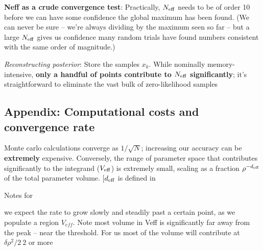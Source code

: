 \documentclass[twocolumn,prd,nofootinbib]{revtex4}
\begin{document}
\begin{shaded}
\noindent \textbf{Neff as  a crude convergence test}: Practically, $N_{\rm eff}$ needs to be of order 10 before we can have some confidence the global maximum has been
found.  (We can never be sure -- we're always dividing by the maximum seen so far -- but a large $N_{\rm eff}$ gives us
confidence many random trials have found numbers consistent with the same order of magnitude.)
\end{shaded}

\noindent \emph{Reconstructing posterior}: Store the samples $x_k$.  While nominally memory-intensive, \textbf{only a handful of
  points contribute to $N_{\rm eff}$ significantly}; it's straightforward to eliminate the vast bulk of zero-likelihood samples



\subsection{Appendix: Computational costs and convergence rate}
Monte carlo calculations converge as $1/\sqrt{N}$; increasing our accuracy can be \textbf{extremely} expensive.  
%
Conversely, the range of parameter space that contributes significantly to the integrand ($V_{\rm eff}$) is extremely
small, scaling as a fraction $\rho^{-d_{\rm eff}}$ of the total parameter volume.  [$d_{\rm eff}$ is defined in \cite{gwastro-mergers-HeeSuk-CompareToPE-Aligned}

\begin{shaded}
Notes for 

we expect the rate to grow slowly and steadily past a certain point, as we populate a region
			$V_{eff}$. Note most volume in Veff is significantly far away from the peak -- near the threshold.
			For us most of the volume will contribute at $\delta \rho^2/2 ~ 2$ or more 
\end{shaded}
\end{document}
